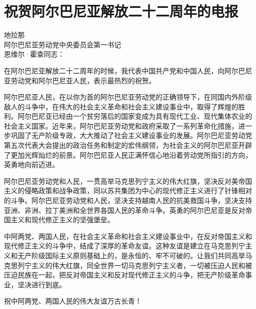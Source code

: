\section[祝贺阿尔巴尼亚解放二十二周年的电报（一九六六年十一月二十八日）]{祝贺阿尔巴尼亚解放二十二周年的电报}


\noindent 地拉那\\
阿尔巴尼亚劳动党中央委员会第一书记\\
恩维尔·霍查同志：

在阿尔巴尼亚解放二十二周年的时候，我代表中国共产党和中国人民，向阿尔巴尼亚劳动党和阿尔巴尼亚人民，表示最热烈的祝贺。

阿尔巴尼亚人民，在以你为首的阿尔巴尼亚劳动党的正确领导下，在同国内外阶级敌人的斗争中，在伟大的社会主义革命和社会主义建设事业中，取得了辉煌的胜利。阿尔巴尼亚已经由一个贫穷落后的国家变成为具有现代工业、现代集体农业的社会主义国家。近年来，阿尔巴尼亚劳动党和政府采取了一系列革命化措施，进一步巩固了无产阶级专政，大大推动了社会主义建设事业的发展。阿尔巴尼亚劳动党第五次代表大会提出的政治任务和制定的宏伟纲领，为社会主义的阿尔巴尼亚开辟了更加光辉灿烂的前景。阿尔巴尼亚人民正满怀信心地沿着劳动党所指引的方向，英勇地向前迈进。

阿尔巴尼亚劳动党和人民，一贯高举马克思列宁主义的伟大红旗，坚决反对美帝国主义的侵略政策和战争政策，同以苏共集团为中心的现代修正主义进行了针锋相对的斗争。阿尔巴尼亚劳动党和人民，坚决支持越南人民的抗美救国斗争，坚决支持亚洲、非洲、拉丁美洲和全世界各国人民的革命斗争。英勇的阿尔巴尼亚是反对帝国主义和现代修正主义的坚强堡垒。

中阿两党、两国人民，在社会主义革命和社会主义建设事业中，在反对帝国主义和现代修正主义的斗争中，结成了深厚的革命友谊。这种友谊是建立在马克思列宁主义和无产阶级国际主义原则基础上的，是永恒的、牢不可破的。让我们共同高举马克思列宁主义的伟大红旗，同全世界一切马克思列宁主义者，一切被压迫人民和被压迫民族在一起，把反对帝国主义和反对现代修正主义的斗争，把无产阶级革命事业，坚决进行到底。

祝中阿两党、两国人民的伟大友谊万古长青！

